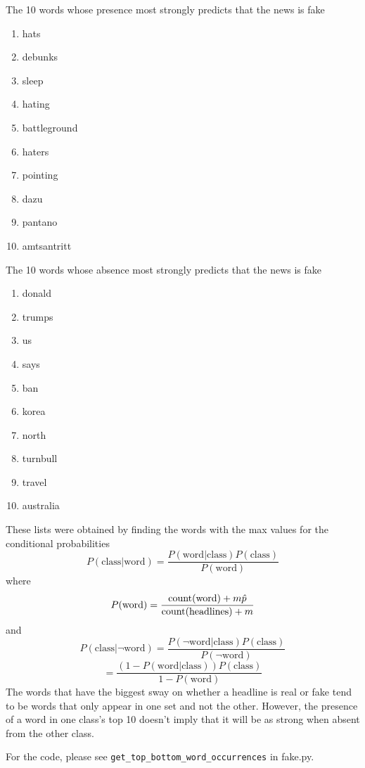 \documentclass[10pt,letterpaper]{article}
\begin{document}
\begin{enumerate}
\begin{enumerate}
			The 10 words whose presence most strongly predicts that the news is fake
			\begin{enumerate}
				\item hats
				\item debunks
				\item sleep
				\item hating
				\item battleground
				\item haters
				\item pointing
				\item dazu
				\item pantano
				\item amtsantritt
			\end{enumerate}

			The 10 words whose absence most strongly predicts that the news is fake
			\begin{enumerate}
				\item donald
				\item trumps
				\item us
				\item says
				\item ban
				\item korea
				\item north
				\item turnbull
				\item travel
				\item australia
			\end{enumerate}

			These lists were obtained by finding the words with the max values for the conditional probabilities
			\[
				P(\text{class} | \text{word}) = \frac{P(\text{word} | \text{class})P(\text{class})}{P(\text{word})}
			\]
			where
			\[
				P(\text{word}) = \frac{\text{count}(\text{word}) + m\hat{p}}{\text{\text{count}}(\text{headlines}) + m}
			\]
			and
			\[
			P(\text{class} | \neg\text{word}) = \frac{P(\neg\text{word} | \text{class})P(\text{class})}{P(\neg\text{word})}
			\]
			\[
			= \frac{(1 - P(\text{word} | \text{class}))P(\text{class})}{1 - P(\text{word})}
			\]
			The words that have the biggest sway on whether a headline is real or fake tend to be words that only appear in one set and not the other.
			However, the presence of a word in one class's top 10 doesn't imply that it will be as strong when absent from the other class.


			For the code, please see \verb|get_top_bottom_word_occurrences| in fake.py.


\end{enumerate}
\end{enumerate}
\end{document}
